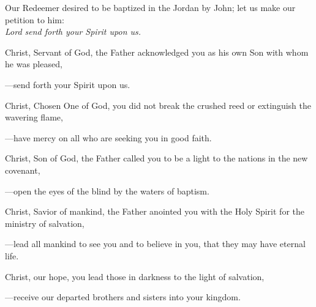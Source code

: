 \intercessions\indent

\begin{hangpar}

Our Redeemer desired to be baptized in the Jordan by John; let us make our petition to him:\\
\emph{Lord send forth your Spirit upon us.}

\medskip Christ, Servant of God, the Father acknowledged you as his own Son with whom he was pleased,

{\color{red}---\thinspace}send forth your Spirit upon us.

\medskip Christ, Chosen One of God, you did not break the crushed reed or extinguish the wavering flame,

{\color{red}---\thinspace}have mercy on all who are seeking you in good faith.

\medskip Christ, Son of God, the Father called you to be a light to the nations in the new covenant,

{\color{red}---\thinspace}open the eyes of the blind by the waters of baptism.

\medskip Christ, Savior of mankind, the Father anointed you with the Holy Spirit for the ministry of salvation,

{\color{red}---\thinspace}lead all mankind to see you and to believe in you, that they may have eternal life.

\medskip Christ, our hope, you lead those in darkness to the light of salvation,

{\color{red}---\thinspace}receive our departed brothers and sisters into your kingdom.

\medskip

\end{hangpar}